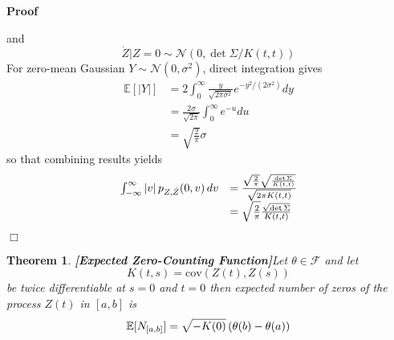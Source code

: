 \documentclass{article}
\newcommand{\tmstrong}[1]{\textbf{#1}}
\newenvironment{proof}{\noindent\textbf{Proof\ }}{\hspace*{\fill}$\Box$\medskip}
\newtheorem{theorem}{Theorem}
\begin{document}
\begin{proof}
\begin{enumerate}
    and
    \begin{equation}
      \dot{Z} |Z = 0 \sim \mathcal{N} (0, \det \Sigma / K (t, t))
    \end{equation}
    For zero-mean Gaussian $Y \sim \mathcal{N} (0, \sigma^2)$, direct
    integration gives
    \begin{equation}
      \begin{array}{ll}
        \mathbb{E} [|Y|] & = 2 \int_0^{\infty} \frac{y}{\sqrt{2 \pi \sigma^2}}
        e^{- y^2 / (2 \sigma^2)} dy\\
        & = \frac{2 \sigma}{\sqrt{2 \pi}}  \int_0^{\infty} e^{- u} du\\
        & = \sqrt{\frac{2}{\pi}} \sigma
      \end{array}
    \end{equation}
    so that combining results yields
    \begin{equation}
      \begin{array}{ll}
        \int_{- \infty}^{\infty} |v|  \hspace{0.17em} p_{Z, \dot{Z}} (0, v) 
        \hspace{0.17em} dv & = \frac{\sqrt{\frac{2}{\pi}}  \sqrt{\frac{\det
        \Sigma}{K (t, t)}}}{\sqrt{2 \pi K (t, t)}}\\
        & = \sqrt{\frac{2}{\pi}}  \frac{\sqrt{\det \Sigma}}{K (t, t)}
      \end{array}
    \end{equation}
  \end{enumerate}
\end{proof}

\begin{theorem}
  {\tmstrong{[Expected Zero-Counting
  Function]}}\label{thm:expected_zero_counting}Let $\theta \in \mathcal{F}$
  and let
  \begin{equation}
    \label{eq:covariance_def} K (t, s) = \mathrm{cov} (Z (t), Z (s))
  \end{equation}
  be twice differentiable at $s = 0$ and $t = 0$ then expected number of zeros
  of the process $Z (t)$ in $[a, b]$ is
  \begin{equation}
    \label{eq:expected_zeros} \mathbb{E} [N_{[a, b]}] = \sqrt{- K (0)} 
    \hspace{0.17em} (\theta (b) - \theta (a))
  \end{equation}
\end{theorem}
\end{document}
